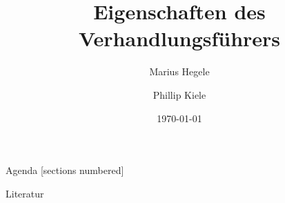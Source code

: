 \documentclass[10pt]{beamer}
\title{Eigenschaften des Verhandlungsführers}
\date{\today}
\author[8786673 \and 3711191]{Marius Hegele \and Phillip Kiele}
\institute{Consulting TINF17A \\DHBW Stuttgart}
\begin{document}
	
	\begin{frame}[plain]
		\maketitle
	\end{frame}
	
	\begin{frame}{Agenda}
		[sections numbered]
		\tableofcontents[hideallsubsections]
	\end{frame}

	
	

	\appendix

	\begin{frame}[plain]
		\maketitle
	\end{frame}

	\begin{frame}[allowframebreaks]{Literatur}
		\printbibliography[heading = none]
	\end{frame}
\end{document}
